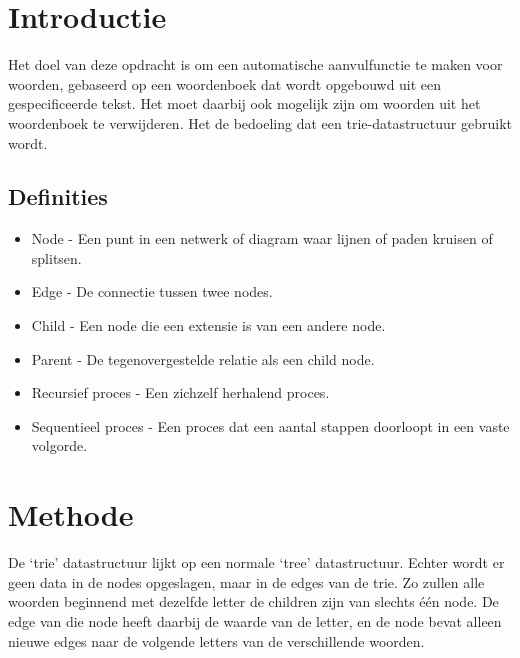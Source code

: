 \documentclass[a4paper,12pt]{article}
\begin{document}

\section{Introductie}
Het doel van deze opdracht is om een automatische aanvulfunctie te maken voor
woorden, gebaseerd op een woordenboek dat wordt opgebouwd uit een
gespecificeerde tekst. Het moet daarbij ook mogelijk zijn om woorden uit het
woordenboek te verwijderen. Het de bedoeling dat een trie-datastructuur
gebruikt wordt.

\subsection{Definities}
\begin{itemize}
    \item Node - Een punt in een netwerk of diagram waar lijnen of paden
        kruisen of splitsen.
    \item Edge - De connectie tussen twee nodes.
    \item Child - Een node die een extensie is van een andere node.
    \item Parent - De tegenovergestelde relatie als een child node.
    \item Recursief proces - Een zichzelf herhalend proces.
    \item Sequentieel proces - Een proces dat een aantal stappen doorloopt in
        een vaste volgorde.
\end{itemize}


\section{Methode}
De `trie' datastructuur lijkt op een normale `tree' datastructuur. Echter wordt
er geen data in de nodes opgeslagen, maar in de edges van de trie. Zo zullen
alle woorden beginnend met dezelfde letter de children zijn van slechts \'e\'en
node. De edge van die node heeft daarbij de waarde van de letter, en de node
bevat alleen nieuwe edges naar de volgende letters van de verschillende
woorden.
\end{document}
